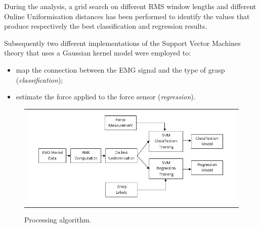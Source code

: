 During the analysis, a grid search on different RMS window lengths and different Online Uniformisation distances has been performed to identify the values that produce respectively the best classification and regression results.

Subsequently two different implementations of the Support Vector Machines theory that uses a Gaussian kernel model were employed to:
\begin{itemize}
	\item map the connection between the EMG signal and the type of grasp (\textit{classification});
	\item estimate the force applied to the force sensor (\textit{regression}).
\end{itemize}

\begin{figure}[!t] \centering
  \begin{tabular}{c}
    \includegraphics[height=0.3\textheight]{figs/Schema} \\
  \end{tabular}
  \caption{Processing algorithm.}
  \label{fig:Algorithm}
\end{figure}
